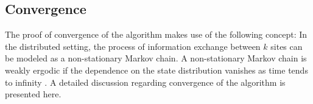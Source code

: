 %
%

\subsection{Convergence}
\label{sec:algterm}
The proof of convergence of the algorithm makes use of the following concept: In the distributed setting, the process of information exchange between $k$ sites can be modeled as a non-stationary Markov chain. A non-stationary Markov chain is weakly ergodic if the dependence on the state distribution vanishes as time tends to infinity \cite{Tsitsiklis_86}. A detailed discussion regarding convergence of the algorithm is presented here. \\


